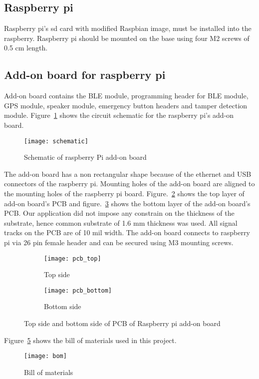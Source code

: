 \subsection{Raspberry pi}
Raspberry pi's sd card with modified Raspbian image, must be installed into the raspberry. Raspberry pi should be mounted on the base using four M2 screws of 0.5 cm length.

\subsection{Add-on board for raspberry pi}
Add-on board contains the BLE module, programming header for BLE module, GPS module, speaker module, emergency button headers and tamper detection module. Figure~\ref{fig:schematic} shows the circuit schematic for the raspberry pi's add-on board.

\begin{figure}
\centering
\texttt{[image: schematic]}
\caption{Schematic of raspberry Pi add-on board}
\label{fig:schematic}
\end{figure}
The add-on board has a non rectangular shape because of the ethernet and USB connectors of the raspberry pi. Mounting holes of the add-on board are aligned to the mounting holes of the raspberry pi board. Figure.~\ref{fig:enc_top_view} shows the top layer of add-on board's PCB and figure.~\ref{fig:enc_bottom_view} shows the bottom layer of the add-on board's PCB. Our application did not impose any constrain on the thickness of the substrate, hence common substrate of 1.6 mm thickness was used. All signal tracks on the PCB are of 10 mil width. The add-on board connects to raspberry pi via 26 pin female header and can be secured using M3 mounting screws.

\begin{figure}[H]
\begin{subfigure}{.5\textwidth}
  \centering
  \texttt{[image: pcb\_top]}
  \caption{Top side}
  \label{fig:enc_top_view}
\end{subfigure}%
\begin{subfigure}{.5\textwidth}
  \centering
  \texttt{[image: pcb\_bottom]}
  \caption{Bottom side}
  \label{fig:enc_bottom_view}
\end{subfigure}
\caption{Top side and bottom side of PCB of Raspberry pi add-on board}
\label{fig:enc_views}
\end{figure}

Figure~\ref{fig:bom} shows the bill of materials used in this project.
\begin{figure}
\centering
\texttt{[image: bom]}
\caption{Bill of materials}
\label{fig:bom}
\end{figure}
